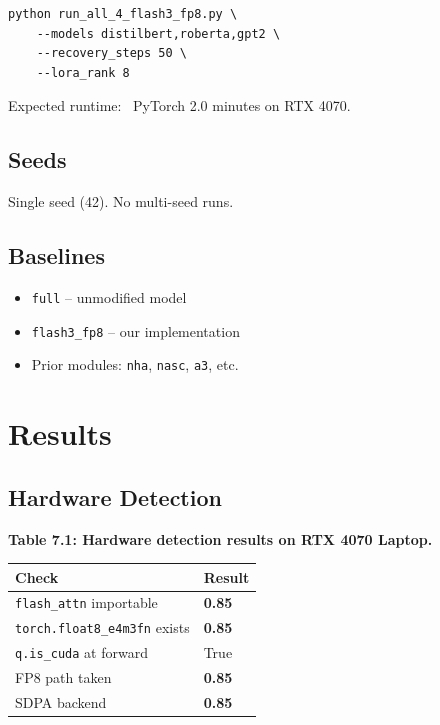 \begin{lstlisting}
python run_all_4_flash3_fp8.py \
    --models distilbert,roberta,gpt2 \
    --recovery_steps 50 \
    --lora_rank 8
\end{lstlisting}

Expected runtime: ~PyTorch 2.0 minutes on RTX 4070.

\subsection{Seeds}

Single seed (42). No multi-seed runs.

\subsection{Baselines}

\begin{itemize}
\item \texttt{full} -- unmodified model
\item \texttt{flash3\_fp8} -- our implementation
\item Prior modules: \texttt{nha}, \texttt{nasc}, \texttt{a3}, etc.

\end{itemize}



\section{Results}

\subsection{Hardware Detection}

\textbf{Table 7.1: Hardware detection results on RTX 4070 Laptop.}

\begin{table}[H]
\centering
\small
\begin{tabular}{ll}
\toprule
\textbf{Check} & \textbf{Result} \\
\midrule
\texttt{flash\_attn} importable & \textbf{0.85} \\
\texttt{torch.float8\_e4m3fn} exists & \textbf{0.85} \\
\texttt{q.is\_cuda} at forward & True \\
FP8 path taken & \textbf{0.85} \\
SDPA backend & \textbf{0.85} \\
\bottomrule
\end{tabular}
\end{table}

